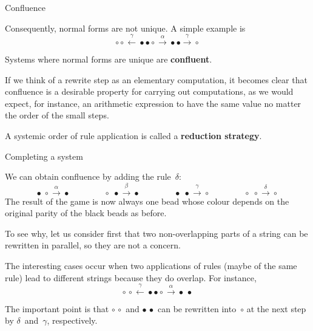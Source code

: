 \documentclass[compress,dvipdfmx]{beamer}
\begin{document}
%
\begin{frame}{Confluence}

  Consequently, normal forms are not unique. A simple example is
  \begin{equation*}
    \circ \circ \xleftarrow{\gamma} \bullet \bullet \circ
    \xrightarrow{\alpha} \bullet \bullet \xrightarrow{\gamma}
    \circ
  \end{equation*}

  \medskip

  Systems where normal forms are unique are \textbf{confluent}.

  \bigskip

  If we think of a rewrite step as an elementary computation, it
  becomes clear that confluence is a desirable property for carrying
  out computations, as we would expect, for instance, an arithmetic
  expression to have the same value no matter the order of the small
  steps.

  \bigskip

  A systemic order of rule application is called a \textbf{reduction
    strategy}.

\end{frame}

%
\begin{frame}{Completing a system}

  We can obtain confluence by adding the rule~\(\delta\):
  \begin{equation*}
    \bullet \; \circ   \xrightarrow{\alpha} \bullet\qquad\qquad
    \circ   \; \bullet \xrightarrow{\beta} \bullet\qquad\qquad
    \bullet \; \bullet \xrightarrow{\gamma}
    \circ\qquad\qquad
    \circ\; \circ \xrightarrow{\delta} \circ
  \end{equation*}
  The result of the game is now always one bead whose colour depends
  on the original parity of the black beads as before.

  \bigskip

  To see why, let us consider first that two non\hyp{}overlapping
  parts of a string can be rewritten in parallel, so they are not a
  concern.

  \bigskip

  The interesting cases occur when two applications of rules (maybe of
  the same rule) lead to different strings because they do
  overlap. For instance,
  \begin{equation*}
    \circ \, \circ \xleftarrow{\gamma} \bullet \bullet
    \circ \xrightarrow{\alpha} \bullet \, \bullet
  \end{equation*}

  \medskip

  The important point is that \(\circ \, \circ\) and \(\bullet \,
  \bullet\) can be rewritten into~\(\circ\) at the next step by
  \(\delta\)~and~\(\gamma\), respectively.

\end{frame}
\end{document}
